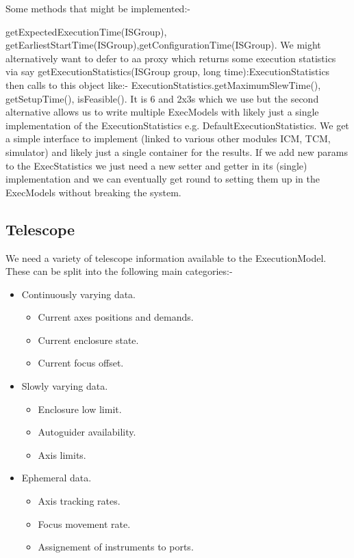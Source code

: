Some methods that might be implemented:-

\textsf{getExpectedExecutionTime(ISGroup)}, \textsf{getEarliestStartTime(ISGroup)},\textsf{getConfigurationTime(ISGroup)}. We might alternatively want to defer to aa proxy which returns some execution statistics via say \textsf{getExecutionStatistics(ISGroup group, long time):ExecutionStatistics} then calls to this object like:- \textsf{ExecutionStatistics.getMaximumSlewTime(), getSetupTime(), isFeasible()}. It is 6 and 2x3s which we use but the second alternative allows us to write multiple ExecModels with likely just a single implementation of the ExecutionStatistics e.g. DefaultExecutionStatistics. We get a simple interface to implement (linked to various other modules ICM, TCM, simulator) and likely just a single container for the results. If we add new params to the ExecStatistics we just need a new setter and getter in its (single) implementation and we can eventually get round to setting them up in the ExecModels without breaking the system.

\subsection{Telescope}
We need a variety of telescope information available to the ExecutionModel. These can be split into the following main categories:-
\begin{itemize}
\item Continuously varying data.
 \begin{itemize}
 \item Current axes positions and demands.
 \item Current enclosure state.
 \item Current focus offset.
 \end{itemize}
\item Slowly varying data.
 \begin{itemize}
 \item Enclosure low limit.
 \item Autoguider availability.
 \item Axis limits.
 \end{itemize}
\item Ephemeral data.
  \begin{itemize}
  \item Axis tracking rates.
  \item Focus movement rate.
  \item Assignement of instruments to ports.
  \end{itemize}
\end{itemize}

